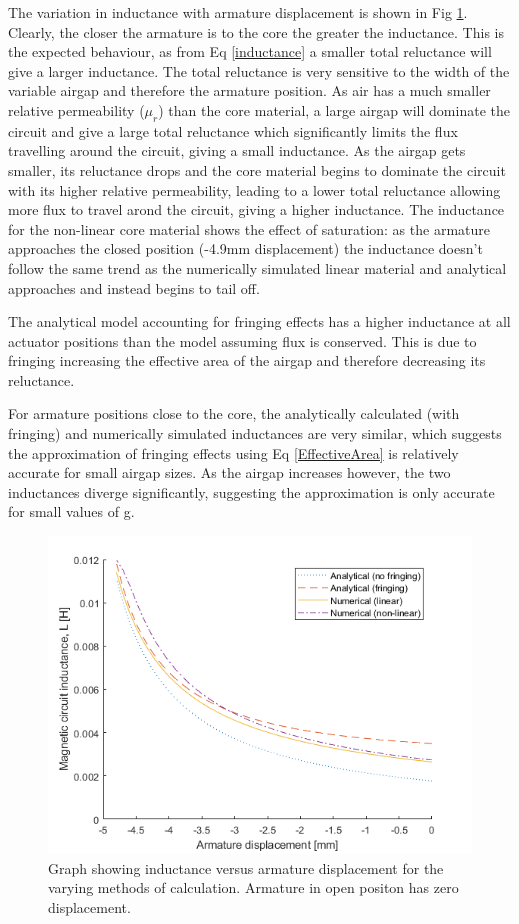 \documentclass[a4paper]{IEEEtran}
\begin{document}
    The variation in inductance with armature displacement is shown in Fig \ref{inductanceGraph}. Clearly, the closer the armature is to the core the greater the inductance. This is the expected behaviour, as from Eq \ref{inductance} a smaller total reluctance will give a larger inductance. The total reluctance is very sensitive to the width of the variable airgap and therefore the armature position. As air has a much smaller relative permeability (\(\mu_r\)) than the core material, a large airgap will dominate the circuit and give a large total reluctance which significantly limits the flux travelling around the circuit, giving a small inductance. As the airgap gets smaller, its reluctance drops and the core material begins to dominate the circuit with its higher relative permeability, leading to a lower total reluctance allowing more flux to travel arond the circuit, giving a higher inductance. The inductance for the non-linear core material shows the effect of saturation: as the armature approaches the closed position (-4.9mm displacement) the inductance doesn't follow the same trend as the numerically simulated linear material and analytical approaches and instead begins to tail off.

    The analytical model accounting for fringing effects has a higher inductance at all actuator positions than the model assuming flux is conserved. This is due to fringing increasing the effective area of the airgap and therefore decreasing its reluctance. 
    
    For armature positions close to the core, the analytically calculated (with fringing) and numerically simulated inductances are very similar, which suggests the approximation of fringing effects using Eq \ref{EffectiveArea} is relatively accurate for small airgap sizes. As the airgap increases however, the two inductances diverge significantly, suggesting the approximation is only accurate for small values of g.

    
    \begin{figure}[htb]
        \includegraphics[width = \linewidth]{Inductances.png}
        \caption{Graph showing inductance versus armature displacement for the varying methods of calculation. Armature in open positon has zero displacement.}
        \label{inductanceGraph} 
    \end{figure}
\end{document}
